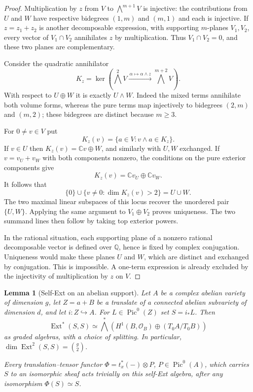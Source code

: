 \documentclass[11pt]{article}
\newtheorem{lemma}[theorem]{Lemma}
\theoremstyle{definition}
\theoremstyle{remark}
\begin{document}
\begin{proof}
Multiplication by $z$ from $V$ to $\bigwedge^{m+1}V$ is injective:
the contributions from $U$ and $W$ have respective bidegrees
$(1,m)$ and $(m,1)$ and each is injective.  If
$z=z_1+z_2$ is another decomposable expression, with supporting
$m$-planes $V_1,V_2$, every vector of $V_1\cap V_2$ annihilates
$z$ by multiplication.  Thus $V_1\cap V_2=0$, and these two planes
are complementary.

Consider the quadratic annihilator
\[
 K_z=\ker\left(\bigwedge^2 V\xrightarrow{\,\alpha\mapsto
                    \alpha\wedge z\,}\bigwedge^{m+2}V\right).
\]
With respect to $U\oplus W$ it is exactly $U\wedge W$.
Indeed the mixed terms annihilate both volume forms, whereas the
pure terms map injectively to bidegrees $(2,m)$ and $(m,2)$;
these bidegrees are distinct because $m\geq3$.

For $0\ne v\in V$ put
\[
 K_z(v)=\{a\in V:v\wedge a\in K_z\}.
\]
If $v\in U$ then $K_z(v)=\mathbb C v\oplus W$, and similarly
with $U,W$ exchanged.  If $v=v_U+v_W$ with both components
nonzero, the conditions on the pure exterior components give
\[
 K_z(v)=\mathbb C v_U\oplus\mathbb C v_W.
\]
It follows that
\[
 \{0\}\cup\{v\ne0:\dim K_z(v)>2\}=U\cup W.
\]
The two maximal linear subspaces of this locus recover the unordered
pair $\{U,W\}$.  Applying the same argument to $V_1\oplus V_2$
proves uniqueness.  The two summand lines then follow by taking
top exterior powers.

In the rational situation, each supporting plane of a nonzero
rational decomposable vector is defined over $\mathbb Q$, hence
is fixed by complex conjugation.  Uniqueness would make these planes
$U$ and $W$, which are distinct and exchanged by conjugation.
This is impossible.  A one-term expression is already excluded by
the injectivity of multiplication by $z$ on $V$.
\end{proof}

\begin{lemma}[Self-Ext on an abelian support]
\label{lem:flat-subtorus-ext}
Let $A$ be a complex abelian variety of dimension $g$, let
$Z=a+B$ be a translate of a connected abelian subvariety of dimension
$d$, and let $i:Z\hookrightarrow A$.  For
$L\in\operatorname{Pic}^0(Z)$ set $S=i_*L$.  Then
\[
 \operatorname{Ext}^*(S,S)\simeq
 \bigwedge^*\left(H^1(B,\mathcal O_B)\oplus
                  (T_0A/T_0B)\right)
\]
as graded algebras, with a choice of splitting.  In particular,
$\dim\operatorname{Ext}^2(S,S)=\binom g2$.

Every translation--tensor functor
$\Phi=t_x^*(-)\otimes P$, $P\in\operatorname{Pic}^0(A)$,
which carries $S$ to an isomorphic sheaf acts trivially on this
self-Ext algebra, after any isomorphism $\Phi(S)\simeq S$.
\end{lemma}
\end{document}
